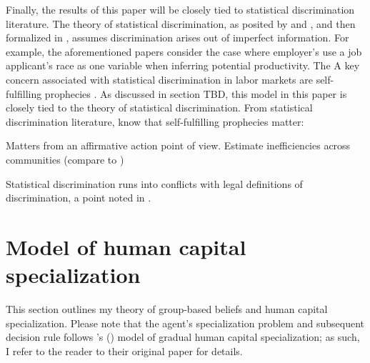 \documentclass[11 pt]{article}
\newcommand{\toedit}[1]{{\color{gray}#1}}
\newcommand{\toedit}[1]{#1}
\newcommand{\citeposs}[1]{{\citeauthor{#1}'s (\citeyear{#1})}}
\begin{document}
Finally, the results of this paper will be closely tied to statistical discrimination literature. 
The theory of statistical discrimination, as posited by \textcite{A72} and \textcite{P72}, and then formalized in \textcite{AC77}, assumes discrimination arises out of imperfect information.
For example, the aforementioned papers consider the case where employer's use a job applicant's race as one variable when inferring potential productivity.
The 
A key concern associated with statistical discrimination in labor markets are self-fulfilling prophecies \parencite{LS83}. 
\toedit{As discussed in section TBD, this model in this paper is closely tied to the theory of statistical discrimination}.
From statistical discrimination literature, know that self-fulfilling prophecies matter:
\begin{blist}
\item \textcite{CL93}
\end{blist}
Matters from an affirmative action point of view. Estimate inefficiencies across communities (compare to \textcite{AL16})

 

Statistical discrimination runs into conflicts with legal definitions of discrimination, a point noted in \textcite{LS83}.

\section{Model of human capital specialization}\label{sec:model}

This section outlines my theory of group-based beliefs and human capital specialization.
Please note that the agent's specialization problem and subsequent decision rule follows \citeposs{AF20} model of gradual human capital specialization; as such, I refer to the reader to their original paper for details. 
\end{document}
